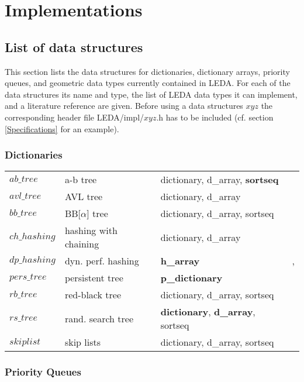 
\chapter{Implementations}

\label{Implementations}

\section{List of data structures}

\label{List of data structures}

This section lists the data structures for dictionaries, dictionary
arrays, priority queues, and geometric data types currently contained in LEDA. 
For each of the data structures its name and type, the list of LEDA data types 
it can implement, and a literature reference are given.
Before using a data structures $xyz$ the corresponding header file
\<LEDA/impl/$xyz$.h\> has to be included (cf. section \ref{Specifications} for an example).

\subsection{Dictionaries}

\label{Implementations Dictionaries}

\begin{tabular}{llll}
$ab\_tree$    &a-b tree     &dictionary, d\_array, {\bf sortseq}&\cite{BC72}\\
$avl\_tree$   &AVL tree     &dictionary, d\_array   &\cite{AVL62}\\
$bb\_tree$    &BB[$\alpha$] tree&dictionary, d\_array, sortseq&\cite{BM80}\\
$ch\_hashing$ &hashing with chaining&dictionary, d\_array&\cite{M84}\\
$dp\_hashing$ &dyn. perf. hashing&{\bf h\_array}    &\cite{DKMMRT88}, \cite{We92}\\
$pers\_tree$  &persistent   tree&{\bf p\_dictionary}&\cite{DSST89}\\
$rb\_tree$    &red-black tree&dictionary, d\_array, sortseq&\cite{GS78}\\
$rs\_tree$    &rand. search tree&{\bf dictionary}, {\bf d\_array}, sortseq&\cite{AS89}\\
$skiplist$    &skip lists   &dictionary, d\_array, sortseq&\cite{Pu90}
\end{tabular}

\subsection{Priority Queues}
\label{Implementations Priority Queues}

